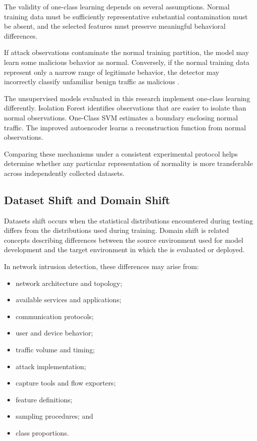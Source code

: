 The validity of one-class learning depends on several assumptions. Normal training data must be sufficiently representative substantial contamination must be absent,  and the selected features must preserve meaningful behavioral differences.

If attack observations contaminate the normal training partition, the model may learn some malicious behavior as normal. Conversely, if the normal training data represent only a narrow range of legitimate behavior,  the detector may incorrectly classify unfamiliar benign traffic as malicious \cite{Pang2021,Yang2022}.

The unsupervised models evaluated in this research implement one-class learning differently. Isolation Forest identifies observations that are easier to isolate than normal observations. One-Class SVM estimates a boundary enclosing normal traffic. The improved autoencoder learns a reconstruction function from normal observations.

Comparing these mechanisms under a consistent experimental protocol helps determine whether any particular representation of normality is more transferable across independently collected datasets. 

\subsection{Dataset Shift and Domain Shift}
\label{subsec:dataset-domain-shift}

Datasets shift occurs when the statistical distributions encountered during testing differs from the distributions used during training. Domain shift is  related concepts describing differences between the source environment used for model development and the target environment in which the is evaluated or deployed. 

In network intrusion detection, these differences may arise from:

\begin{itemize}
\item network architecture and topology;
\item available services and applications;
\item communication protocols;
\item user and device behavior;
\item traffic volume and timing;
\item attack implementation;
\item capture tools and flow exporters;
\item feature definitions;
\item sampling procedures; and 
\item class proportions.
\end{itemize}

